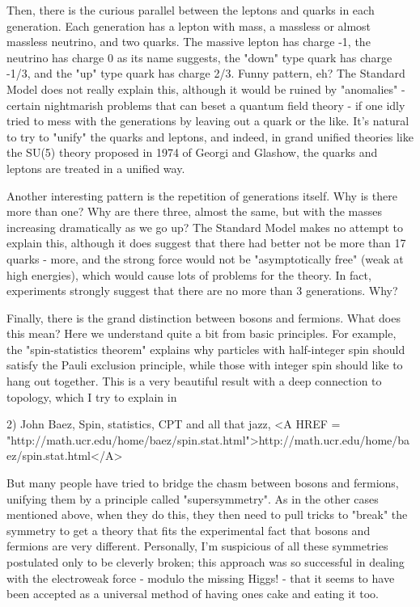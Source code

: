 Then, there is the curious parallel between the leptons and quarks in
each generation.  Each generation has a lepton with mass, a massless or
almost massless neutrino, and two quarks.  The massive lepton has charge
-1, the neutrino has charge 0 as its name suggests, the "down" type
quark has charge -1/3, and the "up" type quark has charge 2/3.  Funny
pattern, eh?  The Standard Model does not really explain this, although
it would be ruined by "anomalies" - certain nightmarish problems that
can beset a quantum field theory - if one idly tried to mess with the
generations by leaving out a quark or the like.  It's natural to try to "unify" the quarks and leptons, and
indeed, in grand unified theories like the SU(5) theory proposed in 1974
of Georgi and Glashow, the quarks and leptons are treated in a unified
way.

Another interesting pattern is the repetition of generations itself.  
Why is there more than one?  Why are there three, almost the same,
but with the masses increasing dramatically as we go up?   The Standard
Model makes no attempt to explain this, although it does suggest that
there had better not be more than 17 quarks - more, and the strong force
would not be "asymptotically free" (weak at high energies), which would
cause lots of problems for the theory.  In fact, experiments strongly
suggest that there are no more than 3 generations.  Why?  

Finally, there is the grand distinction between bosons and fermions.  
What does this mean?  Here we understand quite a bit from basic
principles.  For example, the "spin-statistics theorem" explains why
particles with half-integer spin should satisfy the Pauli exclusion
principle, while those with integer spin should like to hang out
together.  This is a very beautiful result with a deep connection to
topology, which I try to explain in 

2) John Baez, Spin, statistics, CPT and all that jazz, 
<A HREF = "http://math.ucr.edu/home/baez/spin.stat.html">http://math.ucr.edu/home/baez/spin.stat.html</A>

But many people have tried to bridge the chasm between bosons and
fermions, unifying them by a principle called "supersymmetry".  As in
the other cases mentioned above, when they do this, they then need to
pull tricks to "break" the symmetry to get a theory that fits the
experimental fact that bosons and fermions are very different.
Personally, I'm suspicious of all these symmetries postulated only to be
cleverly broken; this approach was so successful in dealing with the
electroweak force - modulo the missing Higgs! - that it seems to
have been accepted as a universal method of having ones cake and eating
it too.  

